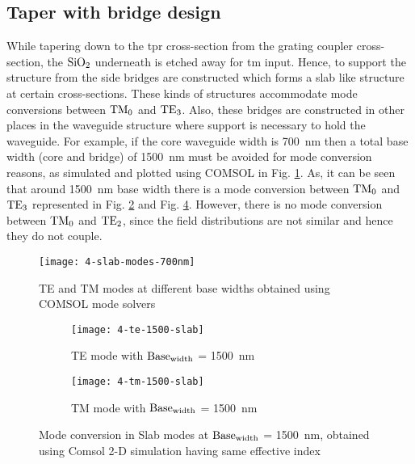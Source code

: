\documentclass[../report.tex]{subfiles}
\begin{document}
\subsection{Taper with bridge design}
While tapering down to the \gls{tpr} cross-section from the grating coupler cross-section, the $\mathrm{SiO_{2}}$ underneath is etched away for \gls{tm} input. Hence, to support the structure from the side bridges are constructed which forms a slab like structure at certain cross-sections. These kinds of structures accommodate mode conversions between $\mathrm{TM_0}$ and $\mathrm{TE_3}$. Also, these bridges are constructed in other places in the waveguide structure where support is necessary to hold the waveguide. For example, if the core waveguide width is \SI{700}{\nano\meter} then a total base width (core and bridge) of \SI{1500}{\nano\meter} must be avoided for mode conversion reasons, as simulated and plotted using COMSOL in Fig. \ref{fig:4_slab_modes_700nm}. As, it can be seen that around \SI{1500}{\nano\meter} base width there is a mode conversion between $\mathrm{TM_0}$ and $\mathrm{TE_3}$ represented in Fig. \ref{fig:4_te_1500_slab} and Fig. \ref{fig:4_tm_1500_slab}. However, there is no mode conversion between $\mathrm{TM_0}$ and $\mathrm{TE_2}$, since the field distributions are not similar and hence they do not couple.
 
 \begin{figure}[H] %
 	\centering
 	\texttt{[image: 4-slab-modes-700nm]}
 	\caption{TE and TM modes at different base widths obtained using COMSOL mode solvers}
 	\label{fig:4_slab_modes_700nm}
 \end{figure}
 
 \begin{figure}[H] %
 	\begin{subfigure}[t]{0.45\textwidth}
 		\texttt{[image: 4-te-1500-slab]}
 		\caption{TE mode with $\mathrm{Base_{width}}$ = \SI{1500}{\nano\meter}}
 		\label{fig:4_te_1500_slab}
 	\end{subfigure}
 	\hfill
 	\begin{subfigure}[t]{0.45\textwidth}
 		\texttt{[image: 4-tm-1500-slab]}
 		\caption{TM mode with $\mathrm{Base_{width}}$ = \SI{1500}{\nano\meter}}
 		\label{fig:4_tm_1500_slab}
 	\end{subfigure}
 	\caption{Mode conversion in Slab modes at $\mathrm{Base_{width}}$ = \SI{1500}{\nano\meter}, obtained using Comsol 2-D simulation having same effective index}
 \end{figure}
\end{document}
